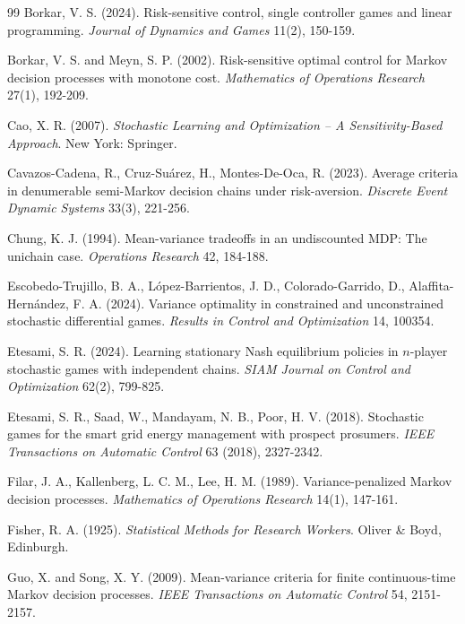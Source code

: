 \documentclass[12pt]{article}
\begin{document}
\begin{thebibliography}{99}
 Borkar, V. S. (2024). Risk-sensitive control, single controller games and linear programming. \emph{Journal of Dynamics and Games} 11(2), 150-159.

 Borkar, V. S. and Meyn, S. P. (2002). Risk-sensitive optimal control for Markov decision processes with monotone cost. \emph{Mathematics of Operations Research} 27(1), 192-209.

 Cao, X. R. (2007). \emph{Stochastic Learning and Optimization -- A Sensitivity-Based Approach}. New York: Springer.

 Cavazos-Cadena, R., Cruz-Su\'{a}rez, H., Montes-De-Oca, R. (2023). Average criteria in denumerable semi-Markov decision chains under risk-aversion. \emph{Discrete Event Dynamic Systems} 33(3), 221-256.

 Chung, K. J. (1994). Mean-variance tradeoffs in an undiscounted MDP: The unichain case. \emph{Operations Research} 42, 184-188.

 Escobedo-Trujillo, B. A., L\'{o}pez-Barrientos, J. D., Colorado-Garrido, D., Alaffita-Hern\'{a}ndez, F. A. (2024). Variance optimality in constrained and unconstrained stochastic differential games. \emph{Results in Control and Optimization} 14, 100354.

 Etesami, S. R. (2024). Learning stationary Nash equilibrium policies in $n$-player stochastic games with independent chains. \emph{SIAM Journal on Control and Optimization} 62(2), 799-825.

 Etesami, S. R., Saad, W., Mandayam, N. B., Poor, H. V. (2018). Stochastic games for the smart grid energy management with prospect prosumers. \emph{IEEE Transactions on Automatic Control} 63 (2018), 2327-2342.

 Filar, J. A., Kallenberg, L. C. M., Lee, H. M. (1989). Variance-penalized Markov decision processes. \emph{Mathematics of Operations Research} 14(1), 147-161.

 Fisher, R. A. (1925). \emph{Statistical Methods for Research Workers}. Oliver \& Boyd, Edinburgh.

 Guo, X. and Song, X. Y. (2009). Mean-variance criteria for finite continuous-time Markov decision processes. \emph{IEEE Transactions on Automatic Control} 54, 2151-2157.


\end{thebibliography}
\end{document}
